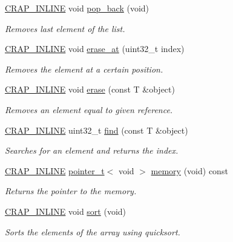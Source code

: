 \begin{DoxyCompactItemize}
\hyperlink{config__x86_8h_a5a40526b8d842e7ff731509998bb0f1c}{C\+R\+A\+P\+\_\+\+I\+N\+L\+I\+N\+E} void \hyperlink{classcrap_1_1list_a54d024e2e4402b54fe6c882fcf2f90ee}{pop\+\_\+back} (void)
\begin{DoxyCompactList}\small\item\em Removes last element of the list. \end{DoxyCompactList}\item 
\hyperlink{config__x86_8h_a5a40526b8d842e7ff731509998bb0f1c}{C\+R\+A\+P\+\_\+\+I\+N\+L\+I\+N\+E} void \hyperlink{classcrap_1_1list_a2ce2638cad5a4caa1b61b094aeac56fb}{erase\+\_\+at} (uint32\+\_\+t index)
\begin{DoxyCompactList}\small\item\em Removes the element at a certain position. \end{DoxyCompactList}\item 
\hyperlink{config__x86_8h_a5a40526b8d842e7ff731509998bb0f1c}{C\+R\+A\+P\+\_\+\+I\+N\+L\+I\+N\+E} void \hyperlink{classcrap_1_1list_afff59cae243e844850c190b81995dcd8}{erase} (const T \&object)
\begin{DoxyCompactList}\small\item\em Removes an element equal to given reference. \end{DoxyCompactList}\item 
\hyperlink{config__x86_8h_a5a40526b8d842e7ff731509998bb0f1c}{C\+R\+A\+P\+\_\+\+I\+N\+L\+I\+N\+E} uint32\+\_\+t \hyperlink{classcrap_1_1list_a4f2d71e5e5b79e64f8d6b679b8476113}{find} (const T \&object)
\begin{DoxyCompactList}\small\item\em Searches for an element and returns the index. \end{DoxyCompactList}\item 
\hyperlink{config__x86_8h_a5a40526b8d842e7ff731509998bb0f1c}{C\+R\+A\+P\+\_\+\+I\+N\+L\+I\+N\+E} \hyperlink{structcrap_1_1pointer__t}{pointer\+\_\+t}$<$ void $>$ \hyperlink{classcrap_1_1list_af621d27bbcbfdab681087e3c3ee1b4c5}{memory} (void) const 
\begin{DoxyCompactList}\small\item\em Returns the pointer to the memory. \end{DoxyCompactList}\item 
\hyperlink{config__x86_8h_a5a40526b8d842e7ff731509998bb0f1c}{C\+R\+A\+P\+\_\+\+I\+N\+L\+I\+N\+E} void \hyperlink{classcrap_1_1list_abb256fdbcf9a1d1356ed6e2243f88f98}{sort} (void)
\begin{DoxyCompactList}\small\item\em Sorts the elements of the array using quicksort. \end{DoxyCompactList}\end{DoxyCompactItemize}
